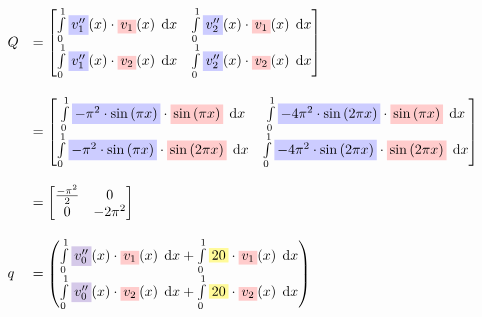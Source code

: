 \documentclass[
final,
a4paper,
oneside,
parskip=full,
headings=standardclasses,
headings=big,
pointednumbers,
fleqn
]{scrartcl}
\newcommand{\tfillb}[1]{\tfillc[#1][blue!20]}
\newcommand{\tfilly}[1]{\tfillc[#1][yellow!40]}
\newcommand{\tfillr}[1]{\tfillc[#1][red!20]}
\newcommand{\tfillv}[1]{\tfillc[#1][Violet!20]}
\newcommand*\difx{\; \mathop{}\!\mathrm{d}x}
\newcommand{\f}[2]{\frac{#1}{#2}}
\newcommand{\kl}[1]{{\left( #1 \right)}}
\begin{document}
    {\setlength{\abovedisplayskip}{-6pt}
    \setlength{\belowdisplayskip}{-12pt}
    \begin{align*}
        \begin{array}{ll}
            Q & = \begin{bmatrix}
                \int\limits_{0}^{1}{\tfillb{$v_1''$}\kl{x} \cdot \tfillr{$v_1$}\kl{x} \difx} &
                \int\limits_{0}^{1}{\tfillb{$v_2''$}\kl{x} \cdot \tfillr{$v_1$}\kl{x} \difx} \\
                \int\limits_{0}^{1}{\tfillb{$v_1''$}\kl{x} \cdot \tfillr{$v_2$}\kl{x} \difx} & 
                \int\limits_{0}^{1}{\tfillb{$v_2''$}\kl{x} \cdot \tfillr{$v_2$}\kl{x} \difx} \\
            \end{bmatrix} \\
            & \\
            & = \begin{bmatrix}
                \int\limits_{0}^{1}{\tfillb{$-\pi^2   \cdot \sin\kl{\pi x}$}   \cdot \tfillr{$\sin\kl{\pi x}$} \difx} &
                \int\limits_{0}^{1}{\tfillb{$-4 \pi^2 \cdot \sin\kl{2 \pi x}$} \cdot \tfillr{$\sin\kl{\pi x}$} \difx} \\
                \int\limits_{0}^{1}{\tfillb{$-\pi^2   \cdot \sin\kl{\pi x}$}   \cdot \tfillr{$\sin\kl{2 \pi x}$} \difx} & 
                \int\limits_{0}^{1}{\tfillb{$-4 \pi^2 \cdot \sin\kl{2 \pi x}$} \cdot \tfillr{$\sin\kl{2 \pi x}$} \difx} \\
            \end{bmatrix} \\
            & \\
            & = \begin{bmatrix}
                \f{-\pi^2}{2} & 0 \\
                0             & -2\pi^2
            \end{bmatrix} \\
            & \\
            q & = \begin{pmatrix}
                \int\limits_{0}^{1}{\tfillv{$v_0''$}\kl{x} \cdot \tfillr{$v_1$}\kl{x} \difx} + 
                \int\limits_{0}^{1}{\tfilly{$20$}          \cdot \tfillr{$v_1$}\kl{x} \difx} \\
                \int\limits_{0}^{1}{\tfillv{$v_0''$}\kl{x} \cdot \tfillr{$v_2$}\kl{x} \difx} + 
                \int\limits_{0}^{1}{\tfilly{$20$}          \cdot \tfillr{$v_2$}\kl{x} \difx}
            \end{pmatrix} \\

\end{array}
\end{align*}}
\end{document}

